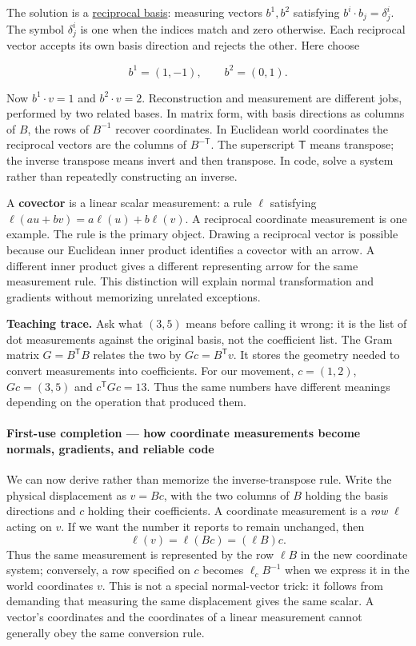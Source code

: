 The solution is a \hyperref[appendix-6b3d696dd902]{reciprocal basis}: measuring vectors \(b^1,b^2\) satisfying \(b^i\cdot b_j=\delta^i_j\). The symbol \(\delta^i_j\) is one when the indices match and zero otherwise. Each reciprocal vector accepts its own basis direction and rejects the other. Here choose

\[
b^1=(1,-1),\qquad b^2=(0,1).
\]

Now \(b^1\cdot v=1\) and \(b^2\cdot v=2\). Reconstruction and measurement are different jobs, performed by two related bases. In matrix form, with basis directions as columns of \(B\), the rows of \(B^{-1}\) recover coordinates. In Euclidean world coordinates the reciprocal vectors are the columns of \(B^{-\mathsf T}\). The superscript \(\mathsf T\) means transpose; the inverse transpose means invert and then transpose. In code, solve a system rather than repeatedly constructing an inverse.

A \textbf{covector} is a linear scalar measurement: a rule \(\ell\) satisfying \(\ell(au+bv)=a\ell(u)+b\ell(v)\). A reciprocal coordinate measurement is one example. The rule is the primary object. Drawing a reciprocal vector is possible because our Euclidean inner product identifies a covector with an arrow. A different inner product gives a different representing arrow for the same measurement rule. This distinction will explain normal transformation and gradients without memorizing unrelated exceptions.

\textbf{Teaching trace.} Ask what \((3,5)\) means before calling it wrong: it is the list of dot measurements against the original basis, not the coefficient list. The Gram matrix \(G=B^{\mathsf T}B\) relates the two by \(Gc=B^{\mathsf T}v\). It stores the geometry needed to convert measurements into coefficients. For our movement, \(c=(1,2)\), \(Gc=(3,5)\) and \(c^{\mathsf T}Gc=13\). Thus the same numbers have different meanings depending on the operation that produced them.

\paragraph{First-use completion --- how coordinate measurements become normals, gradients, and reliable code}\label{first-use-completion-how-coordinate-measurements-become-normals-gradients-and-reliable-code}

We can now derive rather than memorize the inverse-transpose rule. Write the physical displacement as \(v=Bc\), with the two columns of \(B\) holding the basis directions and \(c\) holding their coefficients. A coordinate measurement is a \emph{row} \(\ell\) acting on \(v\). If we want the number it reports to remain unchanged, then \[
\ell(v)=\ell(Bc)=(\ell B)c.
\] Thus the same measurement is represented by the row \(\ell B\) in the new coordinate system; conversely, a row specified on \(c\) becomes \(\ell_c B^{-1}\) when we express it in the world coordinates \(v\). This is not a special normal-vector trick: it follows from demanding that measuring the same displacement gives the same scalar. A vector's coordinates and the coordinates of a linear measurement cannot generally obey the same conversion rule.

